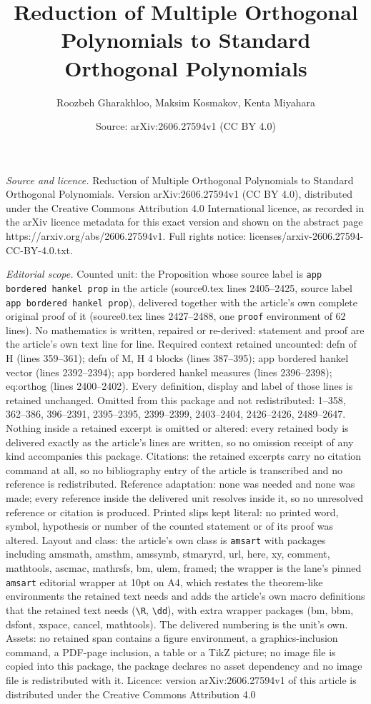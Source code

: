 \documentclass[10pt,a4paper]{amsart}
\title[Reduction of Multiple Orthogonal Polynomials to Standard Ort]{Reduction of Multiple Orthogonal Polynomials to Standard Orthogonal Polynomials}
\author{Roozbeh Gharakhloo, Maksim Kosmakov, Kenta Miyahara}
\date{Source: arXiv:2606.27594v1 (CC BY 4.0)}
\begin{document}
\maketitle

\noindent\emph{Source and licence.} Reduction of Multiple Orthogonal Polynomials to Standard Orthogonal Polynomials. Version arXiv:2606.27594v1 (CC BY 4.0), distributed under the Creative Commons Attribution 4.0 International licence, as recorded in the arXiv licence metadata for this exact version and shown on the abstract page https://arxiv.org/abs/2606.27594v1. Full rights notice: licenses/arxiv-2606.27594-CC-BY-4.0.txt.\par\smallskip

\noindent\textit{Editorial scope.} Counted unit: the Proposition whose source label is \texttt{app bordered hankel prop} in the article (source0.tex lines 2405--2425, source label \texttt{app bordered hankel prop}), delivered together with the article's own complete original proof of it (source0.tex lines 2427--2488, one \texttt{proof} environment of 62 lines). No mathematics is written, repaired or re-derived: statement and proof are the article's own text line for line. Required context retained uncounted: defn of H (lines 359--361); defn of M, H 4 blocks (lines 387--395); app bordered hankel vector (lines 2392--2394); app bordered hankel measures (lines 2396--2398); eq:orthog (lines 2400--2402). Every definition, display and label of those lines is retained unchanged. Omitted from this package and not redistributed: 1--358, 362--386, 396--2391, 2395--2395, 2399--2399, 2403--2404, 2426--2426, 2489--2647. Nothing inside a retained excerpt is omitted or altered: every retained body is delivered exactly as the article's lines are written, so no omission receipt of any kind accompanies this package. Citations: the retained excerpts carry no citation command at all, so no bibliography entry of the article is transcribed and no reference is redistributed. Reference adaptation: none was needed and none was made; every reference inside the delivered unit resolves inside it, so no unresolved reference or citation is produced. Printed slips kept literal: no printed word, symbol, hypothesis or number of the counted statement or of its proof was altered. Layout and class: the article's own class is \texttt{amsart} with packages including amsmath, amsthm, amssymb, stmaryrd, url, here, xy, comment, mathtools, ascmac, mathrsfs, bm, ulem, framed; the wrapper is the lane's pinned \texttt{amsart} editorial wrapper at 10pt on A4, which restates the theorem-like environments the retained text needs and adds the article's own macro definitions that the retained text needs (\texttt{\textbackslash R}, \texttt{\textbackslash dd}), with extra wrapper packages (bm, bbm, dsfont, xspace, cancel, mathtools). The delivered numbering is the unit's own. Assets: no retained span contains a figure environment, a graphics-inclusion command, a PDF-page inclusion, a table or a TikZ picture; no image file is copied into this package, the package declares no asset dependency and no image file is redistributed with it. Licence: version arXiv:2606.27594v1 of this article is distributed under the Creative Commons Attribution 4.0 
\end{document}
